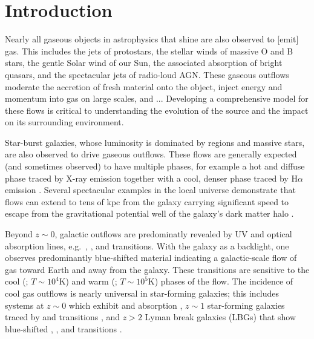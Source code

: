 \documentclass[12pt,preprint]{aastex}
\begin{document}

\section{Introduction}

Nearly all gaseous objects in astrophysics that shine are also
observed to [emit] gas.  This includes the jets of protostars, the
stellar winds of massive O and B stars, the gentle Solar wind
of our Sun, the associated absorption of bright quasars, and the
spectacular jets of radio-loud AGN.   These gaseous outflows moderate
the accretion of fresh material onto the object, inject energy and
momentum into gas on large scales, and ...
Developing a comprehensive model for these flows is critical to
understanding the evolution of the source and the impact on its
surrounding environment.

Star-burst galaxies, whose luminosity is dominated by  regions
and massive stars, are also observed to drive gaseous outflows.  These
flows are generally expected (and sometimes observed) to have multiple
phases, for example a hot and diffuse phase traced by X-ray emission
\citep[e.g.][]{shc+04,km10} together with a cool, denser phase traced by
H$\alpha$ emission \citep[e.g.][]{NGC891}.  Several spectacular
examples in the local universe demonstrate that flows can extend to
tens of kpc from the galaxy \citep{M87} carrying significant speed
to escape from the gravitational potential well of the galaxy's dark
matter halo \citep{wind_escape}.

Beyond $z \sim 0$, galactic outflows are predominatly
revealed by UV and optical absorption lines, e.g.\ ,
,  and  transitions.  With the galaxy
as a backlight, one observes predominantly
blue-shifted material indicating a galactic-scale flow of gas toward
Earth and away from the galaxy.  These transitions are sensitive to
the cool (; $T \sim 10^4$K) and warm (; $T \sim
10^5$K) phases of the flow.  The incidence of cool gas outflows is
nearly universal in star-forming galaxies;  this includes systems at $z \sim 0$
which exhibit  and  absorption
\citep{rvs05a,martin05,smn+09}, $z \sim 1$ star-forming galaxies traced by
 and  transitions \citep{wcp+09,rubin+10}, and
$z>2$ Lyman break galaxies (LBGs) that show blue-shifted ,
, and  transitions \citep{sgp+96,lkg+97}.
\end{document}
